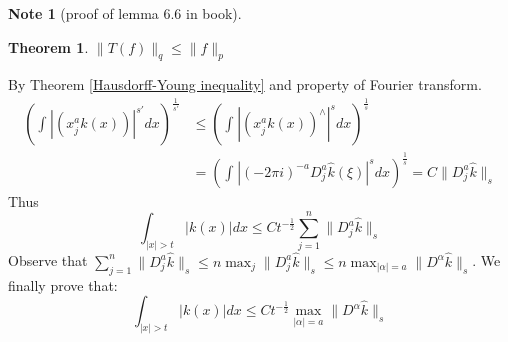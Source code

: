\documentclass{report}
\theoremstyle{definition}
\newtheorem{note}{Note}
\theoremstyle{definition}
\theoremstyle{plain}
\newtheorem{theorem}{Theorem}
\numberwithin{theorem}{subsection}
\numberwithin{remark}{subsection}
\newcommand{\norm}[1]{\lVert#1\rVert}
\newcommand{\abs}[1]{\left\lvert#1\right\rvert}
\begin{document}
\begin{note}[proof of lemma 6.6 in book]
\begin{theorem}
        $\norm{T(f)}_q\leq\norm{f}_p$
    \end{theorem}
    By Theorem \ref{Hausdorff-Young inequality} and property of Fourier transform.
    \begin{align*}
        (\int_{}\abs{(x_j^ak(x))}^{s'}dx)^{\frac{1}{s'}} & \leq (\int_{}\abs{(x_j^ak(x))^\wedge}^{s}dx)^{\frac{1}{s}}                                 \\
                                                         & =(\int_{}\abs{(-2\pi i)^{-a}D_j^a\hat{k}(\xi)}^{s}dx)^{\frac{1}{s}}=C\norm{D_j^a\hat{k}}_s
    \end{align*}
    Thus
    \begin{equation*}
        \int_{\abs{x}>t}^{}{\abs{k(x)}dx}\leq Ct^{-\frac{1}{2}}\sum_{j=1}^n{\norm{D_j^a\hat{k}}_s}
    \end{equation*}
    Observe that $\sum_{j=1}^n{\norm{D_j^a\hat{k}}_s}\leq n\max_j{\norm{D_j^a\hat{k}}_s}\leq n\max_{\abs{\alpha}=a}{\norm{D^\alpha\hat{k}}_s}$. We finally prove that:
    \begin{equation*}
        \int_{\abs{x}>t}^{}{\abs{k(x)}dx}\leq Ct^{-\frac{1}{2}}\max_{\abs{\alpha}=a}{\norm{D^\alpha\hat{k}}_s}
    \end{equation*}
\end{note}
\end{document}
